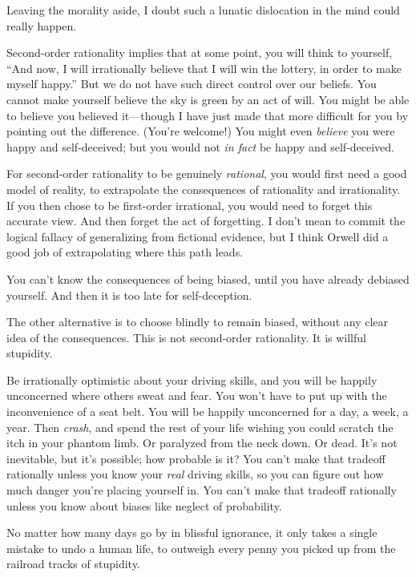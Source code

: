 {
 Leaving the morality aside, I doubt such a lunatic dislocation in
the mind could really happen.}

{
 Second-order rationality implies that at some point, you will
think to yourself, ``And now, I will irrationally
believe that I will win the lottery, in order to make myself
happy.'' But we do not have such direct control over
our beliefs. You cannot make yourself believe the sky is green by an
act of will. You might be able to believe you believed it---though I
have just made that more difficult for you by pointing out the
difference. (You're welcome!) You might even
\textit{believe} you were happy and self-deceived; but you would not
\textit{in fact} be happy and self-deceived.}

{
 For second-order rationality to be genuinely \textit{rational},
you would first need a good model of reality, to extrapolate the
consequences of rationality and irrationality. If you then chose to be
first-order irrational, you would need to forget this accurate view.
And then forget the act of forgetting. I don't mean to
commit the logical fallacy of generalizing from fictional evidence, but
I think Orwell did a good job of extrapolating where this path leads.}

{
 You can't know the consequences of being biased,
until you have already debiased yourself. And then it is too late for
self-deception.}

{
 The other alternative is to choose blindly to remain biased,
without any clear idea of the consequences. This is not second-order
rationality. It is willful stupidity.}

{
 Be irrationally optimistic about your driving skills, and you will
be happily unconcerned where others sweat and fear. You
won't have to put up with the inconvenience of a seat
belt. You will be happily unconcerned for a day, a week, a year. Then
\textit{crash}, and spend the rest of your life wishing you could
scratch the itch in your phantom limb. Or paralyzed from the neck down.
Or dead. It's not inevitable, but it's
possible; how probable is it? You can't make that
tradeoff rationally unless you know your \textit{real} driving skills,
so you can figure out how much danger you're placing
yourself in. You can't make that tradeoff rationally
unless you know about biases like neglect of probability.}

{
 No matter how many days go by in blissful ignorance, it only takes
a single mistake to undo a human life, to outweigh every penny you
picked up from the railroad tracks of stupidity.}

